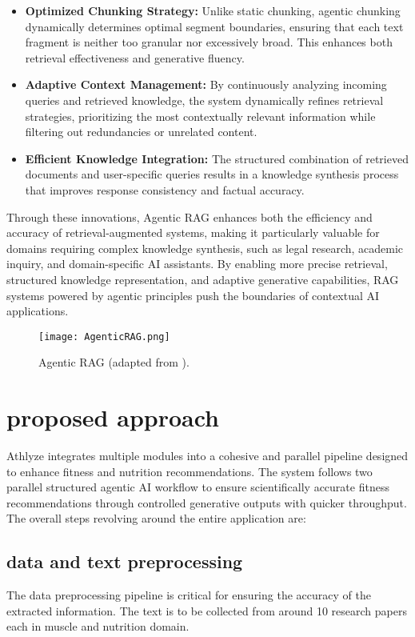 \documentclass[conference]{IEEEtran}
\begin{document}
\begin{itemize}
    \item \textbf{Optimized Chunking Strategy:} Unlike static chunking, agentic chunking dynamically determines optimal segment boundaries, ensuring that each text fragment is neither too granular nor excessively broad. This enhances both retrieval effectiveness and generative fluency. \cite{3}
    \item \textbf{Adaptive Context Management:} By continuously analyzing incoming queries and retrieved knowledge, the system dynamically refines retrieval strategies, prioritizing the most contextually relevant information while filtering out redundancies or unrelated content.
    \item \textbf{Efficient Knowledge Integration:} The structured combination of retrieved documents and user-specific queries results in a knowledge synthesis process that improves response consistency and factual accuracy.
\end{itemize}

Through these innovations, Agentic RAG enhances both the efficiency and accuracy of retrieval-augmented systems, making it particularly valuable for domains requiring complex knowledge synthesis, such as legal research, academic inquiry, and domain-specific AI assistants. By enabling more precise retrieval, structured knowledge representation, and adaptive generative capabilities, RAG systems powered by agentic principles push the boundaries of contextual AI applications.

\begin{figure}[h!]
    \centering
    \texttt{[image: AgenticRAG.png]}
    \caption{Agentic RAG (adapted from \cite{12}).}
    \label{fig:RAG}
\end{figure}


\section{proposed approach}
Athlyze integrates multiple modules into a cohesive and parallel pipeline designed to enhance fitness and nutrition recommendations. The system follows two parallel structured agentic AI workflow to ensure scientifically accurate fitness recommendations through controlled generative outputs with quicker throughput. The overall steps revolving around the entire application are:

\subsection{data and text preprocessing}
The data preprocessing pipeline is critical for ensuring the accuracy of the extracted information. The text is to be collected from around 10 research papers each in muscle and nutrition domain.
\end{document}
